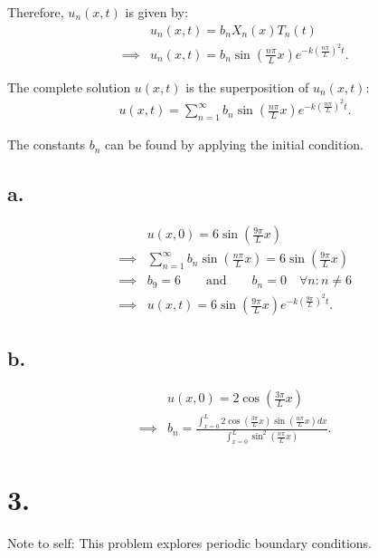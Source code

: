 \documentclass{article}
\begin{document}
\noindent
Therefore, $u_n(x,t)$ is given by:
\begin{align*}
  & u_n(x, t) = b_n X_n(x) T_n(t) \\
  \implies& u_n(x, t) = b_n \sin\left(\frac{n \pi }{L} x\right) e^{-k \left(\frac{n \pi }{L}\right)^2 t}.
\end{align*}

\noindent
The complete solution $u(x ,t)$ is the superposition of $u_n(x, t)$:
\begin{align*}
  u(x, t) = \sum_{n=1}^{\infty}  b_n \sin\left(\frac{n \pi }{L} x\right) e^{-k \left(\frac{n \pi }{L}\right)^2 t}.
\end{align*}

\noindent
The constants $b_n$ can be found by applying the initial condition.

\subsection*{a.}
\begin{align*}
  &u(x, 0) = 6 \sin\left(\frac{9\pi}{L} x\right) \\
  \implies& \sum_{n=1}^{\infty}  b_n \sin\left(\frac{n \pi }{L} x\right) = 6 \sin\left(\frac{9\pi}{L} x\right) \\
  \implies& b_9 = 6 \qquad \text{and} \qquad b_n = 0 \quad \forall n: n \neq 6 \\ 
  \implies& u(x, t) =  6 \sin\left(\frac{9 \pi }{L} x\right) e^{-k \left(\frac{9 \pi }{L}\right)^2 t}.
\end{align*}

\subsection*{b.}
\begin{align*}
  &u(x, 0) = 2 \cos\left(\frac{3\pi}{L} x\right) \\
  \implies& b_n = \frac{\int_{x=0}^{L} 2 \cos\left(\frac{3\pi}{L} x\right) \sin\left(\frac{n \pi }{L} x\right) dx}{\int_{x=0}^{L} \sin^2 \left(\frac{n \pi }{L} x\right)} .
\end{align*}

\section*{3.}
Note to self: This problem explores periodic boundary conditions.
\newline
\end{document}
